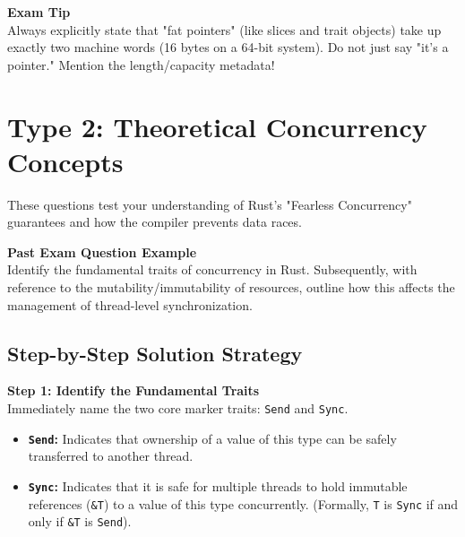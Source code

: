 \begin{insightbox}
\textbf{Exam Tip}\\
Always explicitly state that "fat pointers" (like slices and trait objects) take up exactly two machine words (16 bytes on a 64-bit system). Do not just say "it's a pointer." Mention the length/capacity metadata!
\end{insightbox}

\section{Type 2: Theoretical Concurrency Concepts}

These questions test your understanding of Rust's "Fearless Concurrency" guarantees and how the compiler prevents data races.

\begin{exambox}
\textbf{Past Exam Question Example}\\
Identify the fundamental traits of concurrency in Rust. Subsequently, with reference to the mutability/immutability of resources, outline how this affects the management of thread-level synchronization.
\end{exambox}

\subsection*{Step-by-Step Solution Strategy}

\textbf{Step 1: Identify the Fundamental Traits}\\
Immediately name the two core marker traits: \texttt{Send} and \texttt{Sync}.
\begin{itemize}
    \item \textbf{\texttt{Send}:} Indicates that ownership of a value of this type can be safely transferred to another thread.
    \item \textbf{\texttt{Sync}:} Indicates that it is safe for multiple threads to hold immutable references (\texttt{\&T}) to a value of this type concurrently. (Formally, \texttt{T} is \texttt{Sync} if and only if \texttt{\&T} is \texttt{Send}).
\end{itemize}

